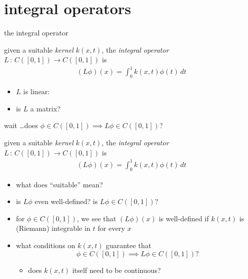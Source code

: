 \documentclass[10pt,
               svgnames,
               hyperref={colorlinks,
                         citecolor=DeepPink4,
                         linkcolor=FireBrick,
                         urlcolor=Maroon},
               usepdftitle=false]{beamer}
\begin{document}
\section{integral operators}

\begin{frame}{the integral operator}

\begin{definition}
given a suitable \emph{kernel} $k(x,t)$, the \emph{integral operator} $L \,:\, C([0,1]) \to C([0,1])$ is
\begin{gather*}
(L\phi)(x) = \int_0^1 k(x,t) \phi(t)\,dt
\end{gather*}
\end{definition}

\begin{itemize}
\item $L$ is linear:

\vspace{20mm}
\item is $L$ a matrix?

\vspace{10mm}
\end{itemize}

\end{frame}


\begin{frame}{wait \dots does $\phi\in C([0,1]) \implies L\phi \in C([0,1])$?}

\begin{definition}
given a {\color{FireBrick} suitable} \emph{kernel} $k(x,t)$, the \emph{integral operator} $L \,:\, C([0,1]) \to C([0,1])$ is
\begin{gather*}
(L\phi)(x) = \int_0^1 k(x,t) \phi(t)\,dt
\end{gather*}
\end{definition}

\begin{itemize}
\item what does ``suitable'' mean?
\item is $L\phi$ even well-defined?  is $L\phi \in C([0,1])$?
\item for $\phi \in C([0,1])$, we see that $(L\phi)(x)$ is well-defined if $k(x,t)$ is (Riemann) integrable in $t$ for every $x$

\bigskip
\item what conditions on $k(x,t)$ guarantee that
  $$\phi\in C([0,1]) \implies L\phi \in C([0,1])?$$

  \begin{itemize}
  \item[$\circ$] does $k(x,t)$ itself need to be continuous?
  \end{itemize}
\end{itemize}
\end{frame}
\end{document}
